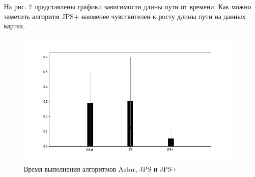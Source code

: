 \documentclass{physlab}
\begin{document}
На рис. 7 представлены графики зависимости длины пути от времени. Как можно заметить алгоритм JPS+ наименее чувствителен к росту длины пути на данных картах. 
\begin{figure}[H]
\begin{minipage}[h]{0.55\linewidth}
\end{minipage}
\hfill
\begin{minipage}[h]{0.52\linewidth}
\end{minipage}
\caption{}
\end{figure} 


\begin{figure}[H] 
\centering
    \includegraphics[width=0.7\linewidth]{2Time1.jpg}
    \caption{Время выполнения алгоритмов Astar, JPS и JPS+}
\end{figure}
\end{document}
